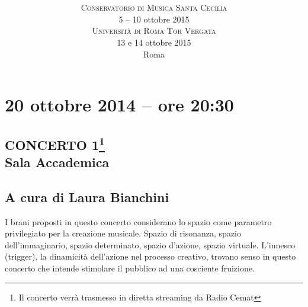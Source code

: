 \documentclass[8pt, twoside, a5paper]{extreport}
\title{
	\svolk{CONSERVATORIO DI MUSICA S. CECILIA} \\
	\fontsize{50}{50}
	\svolk{
		\emph{
			EMUFest 2015
			}
		}
	} %
\author{
	\textsc{Conservatorio di Musica Santa Cecilia} \\
	5 -- 10 ottobre 2015 \\
	\textsc{Università di Roma Tor Vergata} \\
	13 e 14 ottobre 2015 \\
	Roma
}
\date{}
\begin{document}
\pagestyle{empty}
\maketitle 




\section*{20 ottobre 2014 -- ore 20:30}

\subsection*{
	{\small CONCERTO 1\footnote{ Il concerto verrà trasmesso in diretta streaming da Radio Cemat}} \\
	\textsf{Sala Accademica}}

{\fontsize{30}{30} }

\subsection*{\textsf{A cura di Laura Bianchini}}

I brani proposti in questo concerto considerano lo spazio come parametro privilegiato per la creazione musicale.
Spazio di risonanza, spazio dell’immaginario, spazio determinato, spazio d’azione, spazio virtuale.
L’innesco (trigger), la dinamicità dell’azione nel processo creativo, trovano senso in questo concerto che intende stimolare il pubblico ad una cosciente fruizione.

\bigskip
\end{document}
